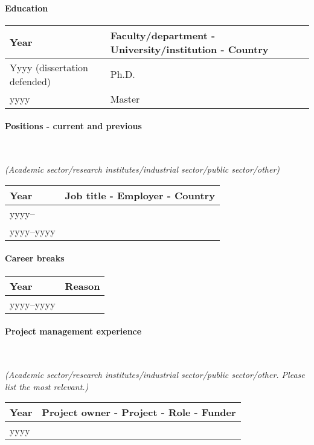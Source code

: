 \documentclass[cv,partner]{nfr}
\begin{document}
\paragraph{Education}
\begin{longtable}{|Y|F|}
    \hline
     Year & Faculty/department - University/institution - Country \\
    \hline
    Yyyy (dissertation defended) & Ph.D. \\
    \hline
    yyyy & Master \\
    \hline
\end{longtable}

\paragraph{Positions - current and previous} ~

\noindent\textit{(Academic sector/research institutes/industrial sector/public
sector/other)}

\begin{longtable}{|Y|F|}
    \hline
     Year & Job title - Employer - Country \\
    \hline
    yyyy-- & ~ \\
    \hline
    yyyy--yyyy & ~ \\
    \hline
\end{longtable}

\paragraph{Career breaks}
\begin{longtable}{|Y|F|}
    \hline
     Year & Reason \\
    \hline
    yyyy--yyyy & ~ \\
    \hline
\end{longtable}

\paragraph{Project management experience} ~

\noindent\textit{(Academic sector/research institutes/industrial sector/public sector/other. Please list the most relevant.)}
\begin{longtable}{|Y|F|}
    \hline
     Year & Project owner - Project - Role - Funder \\
    \hline
    yyyy & ~ \\
    \hline
\end{longtable}
\end{document}
